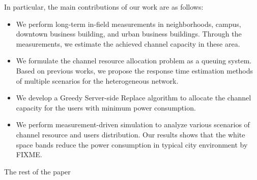 In particular, the main contributions of our work are as follows:
\begin{itemize}
\item We perform long-term in-field measurements in neighborhoods, campus, downtown business building, 
and urban business buildings. Through the measurements, we estimate the achieved channel capacity in 
these area.
\item We formulate the channel resource allocation problem as a queuing system. Based on previous works, we 
propose the response time estimation methods of multiple scenarios for the heterogeneous network.
\item We develop a Greedy Server-side Replace algorithm to allocate the channel capacity for the users with minimum 
power consumption.
\item We perform measurement-driven simulation to analyze various scenarios of channel resource and users distribution. 
Our results shows that the white space bands reduce the power consumption in typical city environment by FIXME.
\end{itemize}

The rest of the paper 
